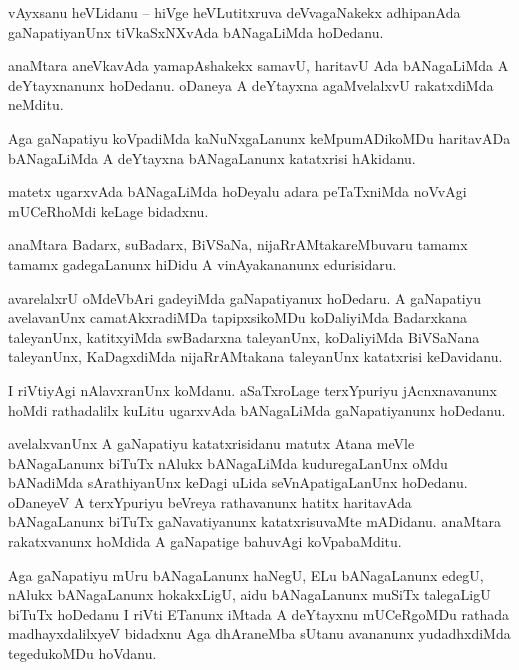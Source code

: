 \documentclass{article}
\begin{document}
\begin{mng}%
vAyxsanu heVLidanu -- hiVge heVLutitxruva deVvagaNakekx adhipanAda gaNapatiyanUnx tiVkaSxNXvAda 
bANagaLiMda hoDedanu.
\end{mng}

\begin{mng}%
anaMtara aneVkavAda yamapAshakekx samavU, haritavU Ada bANagaLiMda A deYtayxnanunx hoDedanu. 
oDaneya A deYtayxna agaMvelalxvU rakatxdiMda neMditu.
\end{mng}

\begin{mng}%
Aga gaNapatiyu koVpadiMda kaNuNxgaLanunx keMpumADikoMDu haritavADa bANagaLiMda A deYtayxna 
bANagaLanunx katatxrisi hAkidanu.
\end{mng}

\begin{mng}%
matetx ugarxvAda bANagaLiMda hoDeyalu adara peTaTxniMda noVvAgi mUCeRhoMdi keLage bidadxnu.
\end{mng}

\begin{mng}%
anaMtara Badarx, suBadarx, BiVSaNa, nijaRrAMtakareMbuvaru tamamx tamamx gadegaLanunx hiDidu A 
vinAyakananunx edurisidaru.
\end{mng}

\begin{mng}%
avarelalxrU oMdeVbAri gadeyiMda gaNapatiyanux hoDedaru. A gaNapatiyu avelavanUnx camatAkxradiMDa 
tapipxsikoMDu koDaliyiMda Badarxkana taleyanUnx, katitxyiMda swBadarxna taleyanUnx, koDaliyiMda 
BiVSaNana taleyanUnx, KaDagxdiMda nijaRrAMtakana taleyanUnx katatxrisi keDavidanu.
\end{mng}

\begin{mng}%
I riVtiyAgi nAlavxranUnx koMdanu. aSaTxroLage terxYpuriyu jAcnxnavanunx hoMdi rathadalilx kuLitu 
ugarxvAda bANagaLiMda gaNapatiyanunx hoDedanu.
\end{mng}

\begin{mng}%
avelalxvanUnx A gaNapatiyu katatxrisidanu matutx Atana meVle bANagaLanunx biTuTx nAlukx bANagaLiMda 
kuduregaLanUnx oMdu bANadiMda sArathiyanUnx keDagi uLida seVnApatigaLanUnx hoDedanu. oDaneyeV A 
terxYpuriyu beVreya rathavanunx hatitx haritavAda bANagaLanunx biTuTx gaNavatiyanunx 
katatxrisuvaMte mADidanu. anaMtara rakatxvanunx hoMdida A gaNapatige bahuvAgi koVpabaMditu.
\end{mng}

\begin{mng}%
Aga gaNapatiyu mUru bANagaLanunx haNegU, ELu bANagaLanunx edegU, nAlukx bANagaLanunx hokakxLigU, 
aidu bANagaLanunx muSiTx talegaLigU biTuTx hoDedanu I riVti ETanunx iMtada A deYtayxnu mUCeRgoMDu 
rathada madhayxdalilxyeV bidadxnu Aga dhAraneMba sUtanu avananunx yudadhxdiMda tegedukoMDu hoVdanu.
\end{mng}
\end{document}
